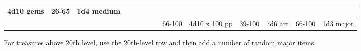 \begin{longtable}{llllllllllllll}
{\begin{minipage}[t]{0.469in}
4d10 gems\end{minipage}} & \multicolumn{1}{p{0.626in}|}{\begin{minipage}[t]{0.626in}\raggedright
26-65\end{minipage}} & \multicolumn{1}{p{0.469in}|}{\begin{minipage}[t]{0.469in}\centering
1d4 medium\end{minipage}}\\
\hline
\multicolumn{8}{p{1.150in}|}{\begin{minipage}[t]{1.150in}\centering
\end{minipage}} & \multicolumn{1}{|p{0.393in}|}{\begin{minipage}[t]{0.393in}\raggedright
66-100\end{minipage}} & \multicolumn{1}{p{0.469in}|}{\begin{minipage}[t]{0.469in}\raggedright
4d10 x 100 pp\end{minipage}} & \multicolumn{1}{p{0.923in}|}{\begin{minipage}[t]{0.923in}\raggedright
39-100\end{minipage}} & \multicolumn{1}{p{0.469in}|}{\begin{minipage}[t]{0.469in}\raggedright
7d6 art\end{minipage}} & \multicolumn{1}{p{0.626in}|}{\begin{minipage}[t]{0.626in}\raggedright
66-100\end{minipage}} & \multicolumn{1}{p{0.469in}|}{\begin{minipage}[t]{0.469in}\centering
1d3 major\end{minipage}}\\
\hline
\end{longtable}

\vspace{12pt}
For treasures above 20th level, use the 20th-level row and then add a number of 
random major items.

